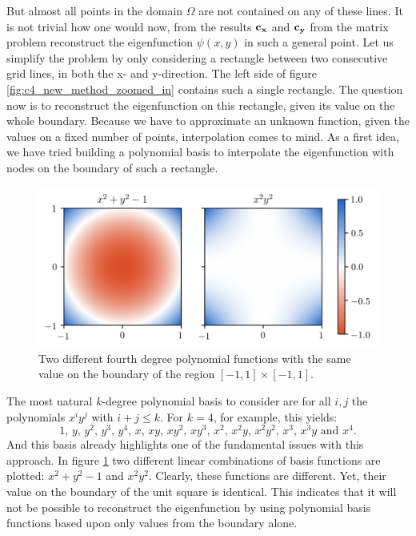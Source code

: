 But almost all points in the domain $\Omega$ are not contained on any of these lines. It is not trivial how one would now, from the results $\vb{c_x}$ and $\vb{c_y}$ from the matrix problem reconstruct the eigenfunction $\psi(x, y)$ in such a general point. Let us simplify the problem by only considering a rectangle between two consecutive grid lines, in both the x- and y-direction. The left side of figure \ref{fig:c4_new_method_zoomed_in} contains such a single rectangle. The question now is to reconstruct the eigenfunction on this rectangle, given its value on the whole boundary. Because we have to approximate an unknown function, given the values on a fixed number of points, interpolation comes to mind. As a first idea, we have tried building a polynomial basis to interpolate the eigenfunction with nodes on the boundary of such a rectangle.

\begin{figure}
    \begin{center}
        \includegraphics[width=1\textwidth]{img/chapter4/nm_interpolation.png}
    \end{center}
    \caption{Two different fourth degree polynomial functions with the same value on the boundary of the region $[-1, 1] \times [-1, 1]$.}\label{fig:c4_interpolation_boundary issue}
\end{figure}

The most natural $k$-degree polynomial basis to consider are for all $i, j$ the polynomials $x^i y^j$ with $i + j \leq k$. For $k = 4$, for example, this yields:
$$
    1\text{, } y\text{, } y^2\text{, } y^3\text{, } y^4\text{, } x\text{, } x y\text{, } x y^2\text{, } x y^3\text{, } x^2\text{, } x^2 y\text{, } x^2 y^2\text{, } x^3\text{, } x^3 y\text{ and } x^4\text{.}
$$
And this basis already highlights one of the fundamental issues with this approach. In figure \ref{fig:c4_interpolation_boundary issue} two different linear combinations of basis functions are plotted: $x^2 + y^2 -1$ and $x^2y^2$. Clearly, these functions are different. Yet, their value on the boundary of the unit square is identical. This indicates that it will not be possible to reconstruct the eigenfunction by using polynomial basis functions based upon only values from the boundary alone.

